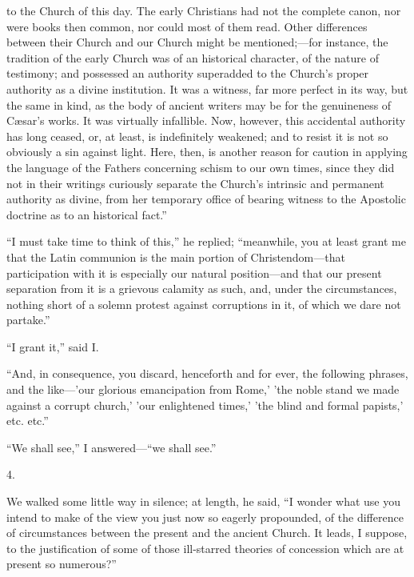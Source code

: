 to the Church of this day. The early Christians had not the complete
canon, nor were books then common, nor could most of them read. Other
differences between their Church and our Church might be
mentioned;—for instance, the tradition of the early Church was of an
historical character, of the nature of testimony; and possessed an
authority superadded to the Church's proper authority as a divine
institution. It was a witness, far more perfect in its way, but the
same in kind, as the body of ancient writers may be for the
genuineness of Cæsar's works. It was virtually infallible. Now,
however, this accidental authority has long ceased, or, at least, is
indefinitely weakened; and to resist it is not so obviously a sin
against light. Here, then, is another reason for caution in applying
the language of the Fathers concerning schism to our own times, since
they did not in their writings curiously separate the Church's
intrinsic and permanent authority as divine, from her temporary office
of bearing witness to the Apostolic doctrine as to an historical fact.''

``I must take time to think of this,'' he replied; ``meanwhile,
you at least grant me that the Latin communion is the main portion of
Christendom—that participation with it is especially our natural
position—and that our present separation from it is a grievous
calamity as such, and, under the circumstances, nothing short of a
solemn protest against corruptions in it, of which we dare not
partake.''

``I grant it,'' said I.

``And, in consequence, you discard, henceforth and
for ever, the following phrases, and the like—'our glorious
emancipation from Rome,' 'the noble stand we made against a corrupt
church,' 'our enlightened times,' 'the blind and formal papists,' etc.
etc.''

``We shall see,'' I answered—``we shall see.''

4.

We walked some little way in silence; at length,
he said, ``I wonder what use you intend to make of the view you just
now so eagerly propounded, of the difference of circumstances between
the present and the ancient Church. It leads, I suppose, to the
justification of some of those ill-starred theories of concession
which are at present so numerous?''

